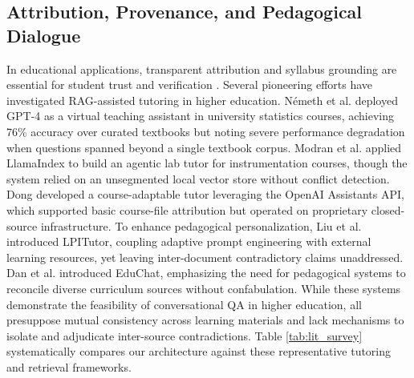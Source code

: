 \documentclass[conference]{IEEEtran}
\begin{document}
\subsection{Attribution, Provenance, and Pedagogical Dialogue}
In educational applications, transparent attribution and syllabus grounding are essential for student trust and verification \cite{kasneci2023chatgpt}. Several pioneering efforts have investigated RAG-assisted tutoring in higher education. N\'{e}meth et al. \cite{nemeth2024rag} deployed GPT-4 as a virtual teaching assistant in university statistics courses, achieving 76\% accuracy over curated textbooks but noting severe performance degradation when questions spanned beyond a single textbook corpus. Modran et al. \cite{modran2024llm} applied LlamaIndex to build an agentic lab tutor for instrumentation courses, though the system relied on an unsegmented local vector store without conflict detection. Dong \cite{dong2023build} developed a course-adaptable tutor leveraging the OpenAI Assistants API, which supported basic course-file attribution but operated on proprietary closed-source infrastructure. To enhance pedagogical personalization, Liu et al. \cite{liu2025lpitutor} introduced LPITutor, coupling adaptive prompt engineering with external learning resources, yet leaving inter-document contradictory claims unaddressed. Dan et al. \cite{dan2024educhat} introduced EduChat, emphasizing the need for pedagogical systems to reconcile diverse curriculum sources without confabulation. While these systems demonstrate the feasibility of conversational QA in higher education, all presuppose mutual consistency across learning materials and lack mechanisms to isolate and adjudicate inter-source contradictions. Table \ref{tab:lit_survey} systematically compares our architecture against these representative tutoring and retrieval frameworks.
\end{document}
